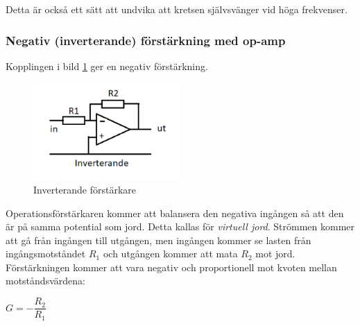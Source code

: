 Detta är också ett sätt att undvika att kretsen självsvänger vid höga frekvenser.

\subsubsection{Negativ (inverterande) förstärkning med op-amp}
\label{inverterande förstärkning}
\label{virtuell jord}
\label{jordning!virtuell}

Kopplingen i bild \ref{fig:BildII2-47} ger en negativ förstärkning.

\begin{figure}
	\includegraphics[width=0.5\textwidth]{images/cropped_pdfs/bild_2_2-47.pdf}
	\caption{Inverterande förstärkare}
	\label{fig:BildII2-47}
\end{figure}

Operationsförstärkaren kommer att balansera den negativa ingången så att den är på samma
potential som jord. Detta kallas för \emph{virtuell jord}.
Strömmen kommer att gå från ingången till utgången, men ingången kommer se lasten
från ingångsmotståndet \(R_1\) och utgången kommer att mata \(R_2\) mot jord.
Förstärkningen kommer att vara negativ och proportionell mot kvoten mellan motståndsvärdena:

\(G = -\dfrac{R_2}{R_1}\)
